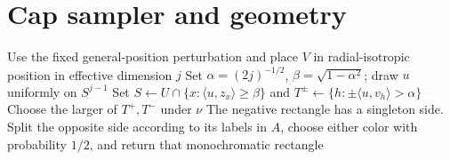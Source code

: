 \section{Cap sampler and geometry}\label{app:capprocedures}
\begin{algorithm}[t]
\caption{Cap sampler from a strict template}\label{alg:caps}
Use the fixed general-position perturbation and place $V$ in radial-isotropic position in effective dimension $j$\;
Set $\alpha=(2j)^{-1/2}$, $\beta=\sqrt{1-\alpha^2}$; draw $u$ uniformly on $S^{j-1}$\;
Set $S\gets U\cap\{x:\langle u,z_x\rangle\ge\beta\}$ and $T^\pm\gets\{h:\pm\langle u,v_h\rangle>\alpha\}$\;
Choose the larger of $T^+,T^-$ under $\nu$\;
The negative rectangle has a singleton side. Split the opposite side according to its labels in $A$, choose either color with probability $1/2$, and return that monochromatic rectangle\;
\end{algorithm}

